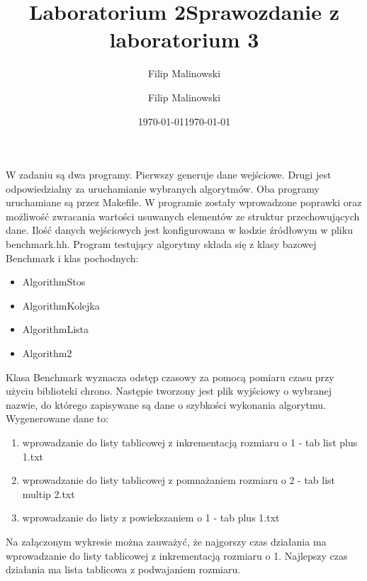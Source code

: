 \documentclass[a4paper,10pt]{scrartcl}
\title{Laboratorium 2}
\author{Filip Malinowski}
\date{\today}
\begin{document}
\title{Sprawozdanie z laboratorium 3}
\author{Filip Malinowski}
\date{\today}

\maketitle

W zadaniu są dwa programy. Pierwszy generuje dane wejściowe.
Drugi jest odpowiedzialny za uruchamianie wybranych algorytmów.
Oba programy uruchamiane są przez Makefile.
W programie zostały wprowadzone poprawki oraz możliwość zwracania
wartości usuwanych elementów ze struktur przechowujących dane.
Ilość danych wejściowych jest konfigurowana w kodzie źródłowym
w pliku benchmark.hh.
Program testujący algorytmy składa się z klasy bazowej
Benchmark i klas pochodnych:
\begin{itemize}
 \item AlgorithmStos
 \item AlgorithmKolejka
 \item AlgorithmLista
 \item Algorithm2
\end{itemize}

Klasa Benchmark wyznacza odstęp czasowy za pomocą pomiaru czasu
przy użyciu biblioteki chrono. Następie tworzony jest plik
wyjściowy o wybranej nazwie, do którego zapisywane są
dane o szybkości wykonania algorytmu. Wygenerowane dane to:
\begin{enumerate}
 \item wprowadzanie do listy tablicowej z inkrementacją rozmiaru o 1 - tab list plus 1.txt
 \item wprowadzanie do listy tablicowej z pomnażaniem rozmiaru o 2 - tab list multip 2.txt
 \item wprowadzanie do listy z powiekszaniem o 1 - tab plus 1.txt
\end{enumerate}

Na załączonym wykresie można zauważyć, że najgorszy czas działania
ma wprowadzanie do listy tablicowej z inkrementacją rozmiaru o 1.
Najlepszy czas działania ma lista tablicowa z podwajaniem rozmiaru.
\end{document}

